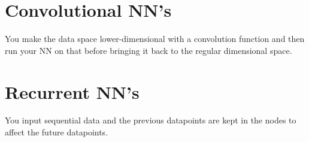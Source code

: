 \documentclass[fleqn]{report}
\begin{document}
\section{Convolutional NN's}
You make the data space lower-dimensional with a convolution function and then 
run your NN on that before bringing it back to the regular dimensional space.

\section{Recurrent NN's}
You input sequential data and the previous datapoints are kept in the nodes 
to affect the future datapoints. 
\end{document}
